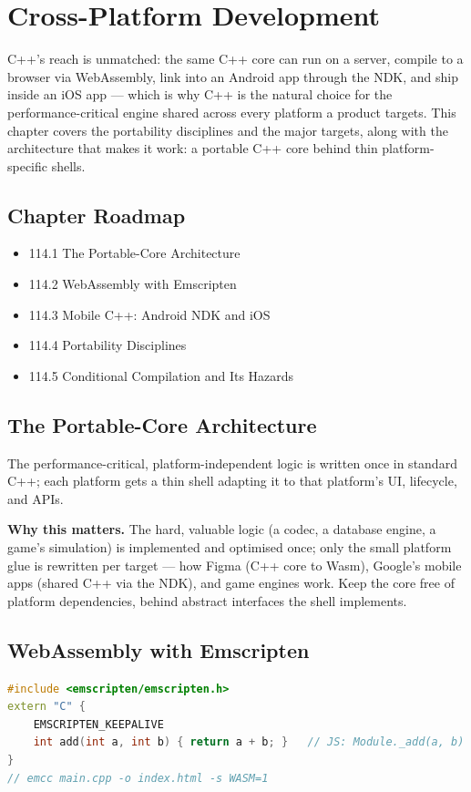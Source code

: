 \chapter{Cross-Platform Development}

C++'s reach is unmatched: the same C++ core can run on a server, compile to a browser via WebAssembly, link into an Android app through the NDK, and ship inside an iOS app --- which is why C++ is the natural choice for the performance-critical engine shared across every platform a product targets. This chapter covers the portability disciplines and the major targets, along with the architecture that makes it work: a portable C++ core behind thin platform-specific shells.

\section*{Chapter Roadmap}
\begin{itemize}
\item 114.1 The Portable-Core Architecture
\item 114.2 WebAssembly with Emscripten
\item 114.3 Mobile C++: Android NDK and iOS
\item 114.4 Portability Disciplines
\item 114.5 Conditional Compilation and Its Hazards
\end{itemize}

\section{The Portable-Core Architecture}
The performance-critical, platform-independent logic is written once in standard C++; each platform gets a thin shell adapting it to that platform's UI, lifecycle, and APIs.

\textbf{Why this matters.} The hard, valuable logic (a codec, a database engine, a game's simulation) is implemented and optimised once; only the small platform glue is rewritten per target --- how Figma (C++ core to Wasm), Google's mobile apps (shared C++ via the NDK), and game engines work. Keep the core free of platform dependencies, behind abstract interfaces the shell implements.

\section{WebAssembly with Emscripten}
\begin{lstlisting}[language=C++, caption={A C++ function exported to JavaScript via Emscripten. Non-portable. Min standard: C++11.}]
#include <emscripten/emscripten.h>
extern "C" {
    EMSCRIPTEN_KEEPALIVE
    int add(int a, int b) { return a + b; }   // JS: Module._add(a, b)
}
// emcc main.cpp -o index.html -s WASM=1
\end{lstlisting}

